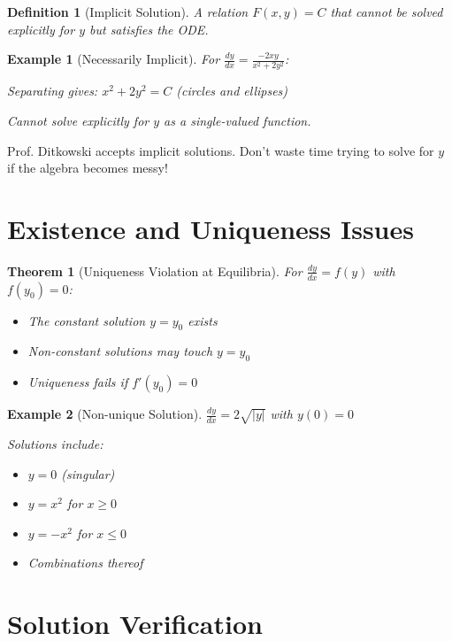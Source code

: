 \documentclass[12pt]{article}
\newtheorem{definition}{Definition}
\newtheorem{theorem}{Theorem}
\newtheorem{example}{Example}
\begin{document}
\begin{definition}[Implicit Solution]
A relation $F(x,y) = C$ that cannot be solved explicitly for $y$ but satisfies the ODE.
\end{definition}

\begin{example}[Necessarily Implicit]
For $\frac{dy}{dx} = \frac{-2xy}{x^2 + 2y^2}$:

Separating gives: $x^2 + 2y^2 = C$ (circles and ellipses)

Cannot solve explicitly for $y$ as a single-valued function.
\end{example}

\begin{examtip}
Prof. Ditkowski accepts implicit solutions. Don't waste time trying to solve for $y$ if the algebra becomes messy!
\end{examtip}

\section{Existence and Uniqueness Issues}

\begin{theorem}[Uniqueness Violation at Equilibria]
For $\frac{dy}{dx} = f(y)$ with $f(y_0) = 0$:
\begin{itemize}
    \item The constant solution $y = y_0$ exists
    \item Non-constant solutions may touch $y = y_0$
    \item Uniqueness fails if $f'(y_0) = 0$
\end{itemize}
\end{theorem}

\begin{example}[Non-unique Solution]
$\frac{dy}{dx} = 2\sqrt{|y|}$ with $y(0) = 0$

Solutions include:
\begin{itemize}
    \item $y = 0$ (singular)
    \item $y = x^2$ for $x \geq 0$
    \item $y = -x^2$ for $x \leq 0$
    \item Combinations thereof
\end{itemize}
\end{example}

\section{Solution Verification}
\end{document}
